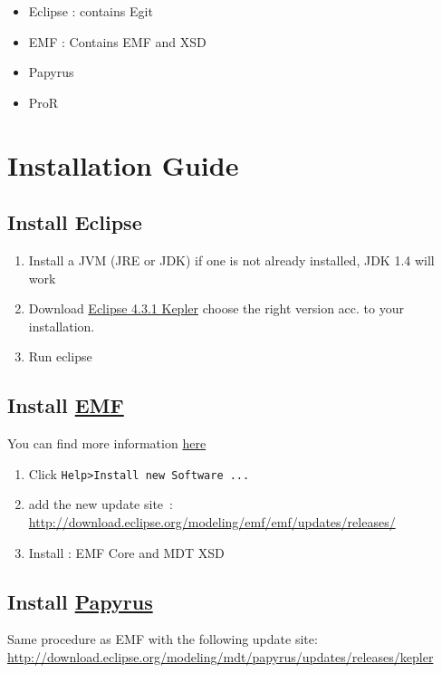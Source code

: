 \documentclass{openetcs_report}
\begin{document}
\begin{itemize}
\item Eclipse : contains Egit 
\item EMF : Contains EMF and XSD 
\item Papyrus
\item ProR
\end{itemize}


\section{Installation Guide}
\subsection{Install Eclipse}
\begin{enumerate}
\item  Install a JVM (JRE or JDK)  if one is not already installed,  JDK 1.4 will work
\item Download
  \href{http://eclipse.org/downloads/packages/eclipse-standard-431/keplersr1}{Eclipse
    4.3.1 Kepler} choose the right version acc. to your installation.
\item Run eclipse
\end{enumerate}

\subsection{Install  \href{http://www.eclipse.org/modeling/emf/}{EMF}}
You can find more information
\href{http://help.eclipse.org/juno/index.jsp?topic=%2Forg.eclipse.platform.doc.user%2Ftasks%2Ftasks-124.htm}{here}
\begin{enumerate}
\item Click \verb+Help>Install new Software ...+ 
\item add the new update site~:
\url{http://download.eclipse.org/modeling/emf/emf/updates/releases/}
\item Install : EMF Core and MDT XSD
\end{enumerate}

 \subsection{Install \href{http://www.eclipse.org/papyrus/}{Papyrus}}
Same procedure as EMF with the following update site:
\url{http://download.eclipse.org/modeling/mdt/papyrus/updates/releases/kepler}
\end{document}
